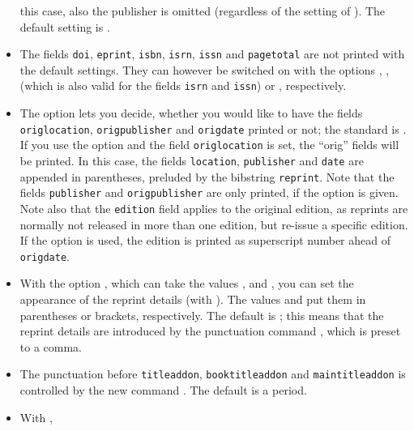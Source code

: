\documentclass[english]{scrartcl}
\begin{document}
\begin{itemize}
        this case, also the publisher is omitted (regardless of the setting of
        ). The default setting is .
  \item The fields \texttt{doi}, \texttt{eprint}, \texttt{isbn}, \texttt{isrn},
        \texttt{issn} and \texttt{pagetotal} are not printed with the default 
        settings. They can however be switched on with the options 
        , ,  (which is also valid
				for the fields \texttt{isrn} and \texttt{issn}) or ,
        respectively.       
  \item The option  lets you decide, whether you would like 
        to have the fields \texttt{origlocation}, \texttt{origpublisher} and 
        \texttt{origdate} printed or not; the standard is . If you 
        use the option and the field \texttt{origlocation} is set, the 
        \enquote{orig} fields will be printed. In this case, the fields 
        \texttt{location}, \texttt{publisher} and \texttt{date} are appended 
        in parentheses, preluded by the bibstring \texttt{reprint}. Note that 
        the fields \texttt{publisher} and \texttt{origpublisher} are only 
        printed, if the option  is given.
        \achtung Note also that the \texttt{edition} field applies to the 
        original edition, as reprints are normally not released in more than 
        one edition, but re-issue a specific edition. If the option 
         is used, the edition is printed as superscript number 
        ahead of \texttt{origdate}.
  \item With the option , which can take the values 
        ,  and , you can set the 
        appearance of the reprint details (with ). The 
        values  and  put them in parentheses or 
        brackets, respectively. The default is ; this means that 
        the reprint details are introduced by the punctuation command 
        , which is preset to a comma.
  \item The punctuation before \texttt{titleaddon}, \texttt{booktitleaddon} 
        and \texttt{maintitleaddon} is controlled by the new command 
        . The default is a period.
	\item With ,

\end{itemize}
\end{document}
